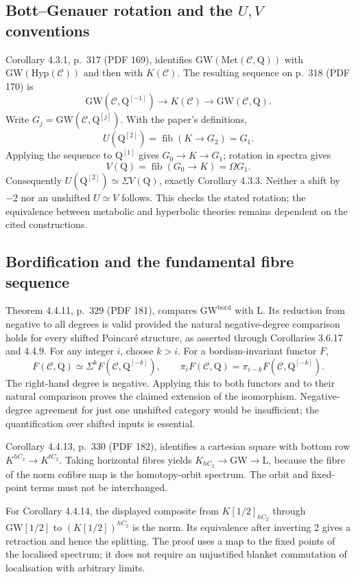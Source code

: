 \documentclass[10pt]{article}
\begin{document}
\subsection*{Bott–Genauer rotation and the \(U,V\) conventions}
Corollary 4.3.1, p. 317 (PDF 169), identifies \(\mathrm{GW}(\mathrm{Met}(\mathcal C,\mathord{\mathrm{Q}}))\) with \(\mathrm{GW}(\mathrm{Hyp}(\mathcal C))\) and then with \(K(\mathcal C)\). The resulting sequence on p. 318 (PDF 170) is \[\mathrm{GW}(\mathcal C,\mathord{\mathrm{Q}}^{[-1]})\longrightarrow K(\mathcal C)
 \longrightarrow\mathrm{GW}(\mathcal C,\mathord{\mathrm{Q}}).\] Write \(G_j=\mathrm{GW}(\mathcal C,\mathord{\mathrm{Q}}^{[j]})\). With the paper’s definitions, \[U(\mathord{\mathrm{Q}}^{[2]})=\operatorname{fib}(K\to G_2)=G_1.\] Applying the sequence to \(\mathord{\mathrm{Q}}^{[1]}\) gives \(G_0\to K\to G_1\); rotation in spectra gives \[V(\mathord{\mathrm{Q}})=\operatorname{fib}(G_0\to K)=\Omega G_1.\] Consequently \(U(\mathord{\mathrm{Q}}^{[2]})\simeq\Sigma V(\mathord{\mathrm{Q}})\), exactly Corollary 4.3.3. Neither a shift by \(-2\) nor an unshifted \(U\simeq V\) follows. This checks the stated rotation; the equivalence between metabolic and hyperbolic theories remains dependent on the cited constructions.\par
\subsection*{Bordification and the fundamental fibre sequence}
Theorem 4.4.11, p. 329 (PDF 181), compares \(\mathrm{GW}^{\mathrm{bord}}\) with \(\mathrm{L}\). Its reduction from negative to all degrees is valid provided the natural negative-degree comparison holds for every shifted Poincaré structure, as asserted through Corollaries 3.6.17 and 4.4.9. For any integer \(i\), choose \(k>i\). For a bordism-invariant functor \(F\), \[F(\mathcal C,\mathord{\mathrm{Q}})\simeq \Sigma^k F(\mathcal C,\mathord{\mathrm{Q}}^{[-k]}),\qquad
 \pi_iF(\mathcal C,\mathord{\mathrm{Q}})=\pi_{i-k}F(\mathcal C,\mathord{\mathrm{Q}}^{[-k]}).\] The right-hand degree is negative. Applying this to both functors and to their natural comparison proves the claimed extension of the isomorphism. Negative-degree agreement for just one unshifted category would be insufficient; the quantification over shifted inputs is essential.\par
Corollary 4.4.13, p. 330 (PDF 182), identifies a cartesian square with bottom row \(K^{hC_2}\to K^{tC_2}\). Taking horizontal fibres yields \(K_{hC_2}\to\mathrm{GW}\to\mathrm{L}\), because the fibre of the norm cofibre map is the homotopy-orbit spectrum. The orbit and fixed-point terms must not be interchanged.\par
For Corollary 4.4.14, the displayed composite from \(K[1/2]_{hC_2}\) through \(\mathrm{GW}[1/2]\) to \((K[1/2])^{hC_2}\) is the norm. Its equivalence after inverting 2 gives a retraction and hence the splitting. The proof uses a map to the fixed points of the localised spectrum; it does not require an unjustified blanket commutation of localisation with arbitrary limits.\par
\end{document}
